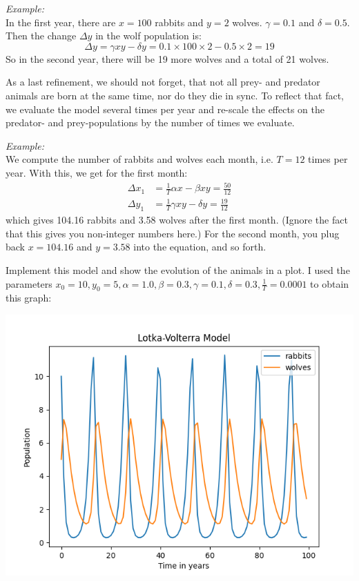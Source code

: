 \documentclass[
	english,
	fontsize=10pt,
	parskip=half,
	titlepage=true,
	DIV=12
]{scrartcl}
\begin{document}
\emph{Example:}\\
In the first year, there are $x = 100$ rabbits and $y = 2$ wolves. $\gamma = 0.1$ and $\delta = 0.5$. Then the change $\Delta y$ in the wolf population is:
\[ \Delta y = \gamma x y - \delta y = 0.1 \times 100 \times 2 - 0.5 \times 2 = 19 \]
So in the second year, there will be 19 more wolves and a total of 21 wolves.

As a last refinement, we should not forget, that not all prey- and predator animals are born at the same time, nor do they die in sync. To reflect that fact, we evaluate the model several times per year and re-scale the effects on the predator- and prey-populations by the number of times we evaluate.

\emph{Example:}\\
We compute the number of rabbits and wolves each month, i.e. $T = 12$ times per year. With this, we get for the first month:
\begin{align*}
	\Delta x_1 &= \frac{1}{T} \alpha x   - \beta x y = \frac{50}{12} \\
	\Delta y_1 &= \frac{1}{T} \gamma x y - \delta  y = \frac{19}{12}
\end{align*}
which gives 104.16 rabbits and 3.58 wolves after the first month. (Ignore the fact that this gives you non-integer numbers here.) For the second month, you plug back $x = 104.16$ and $y = 3.58$ into the equation, and so forth.

Implement this model and show the evolution of the animals in a plot. I used the parameters $x_0 = 10, y_0 = 5, \alpha = 1.0, \beta = 0.3, \gamma = 0.1, \delta = 0.3, \frac{1}{T} = 0.0001$ to obtain this graph:

\begin{center}
	\includegraphics[width=.6\linewidth]{./Lotka-Voltera}
\end{center}
\end{document}
